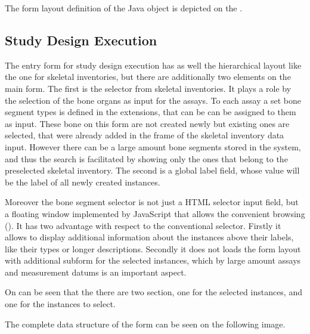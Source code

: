 
The form layout definition of the Java object is depicted on the . 


\subsection{Study Design Execution} \label{43}


The entry form for study design execution has as well the hierarchical layout like the one for skeletal inventories, but there are additionally two elements on the main form. The first is the selector from skeletal inventories. It plays a role by the selection of the bone organs as input for the assays. To each assay a set bone segment types is defined in the extensions, that can be can be assigned to them as input. These bone on this form are not created newly but existing ones are selected, that were already added in the frame of the skeletal inventory data input.  However there can be a large amount bone segments stored in the system, and thus the search is facilitated by showing only the ones that belong to the preselected skeletal inventory. The second is a global label field, whose value will be the label of all newly created instances.





Moreover the bone segment selector is not just a HTML selector input field, but a floating window implemented by JavaScript that allows the convenient browsing (). It has two advantage with respect to the conventional selector. Firstly it allows to display additional information about the instances above their labels, like their types or longer descriptions. Secondly it does not loads the form layout with additional subform for the selected instances, which by large amount assays and measurement datums is an important aspect.



On  can be seen that the there are two section, one for the selected instances, and one for the instances to select. 


The complete data structure of the form can be seen on the following image.



